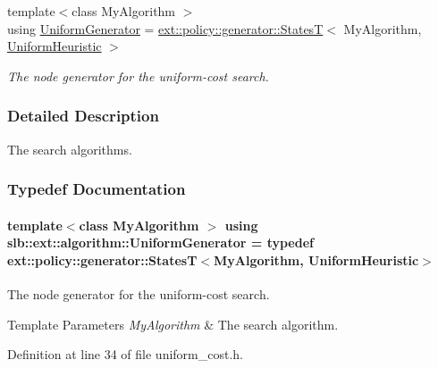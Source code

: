 \begin{DoxyCompactItemize}
{\footnotesize template$<$class My\+Algorithm $>$ }\\using \hyperlink{namespaceslb_1_1ext_1_1algorithm_afe2eae9c2d224b1677a1e95c013c13b4}{Uniform\+Generator} = \hyperlink{structslb_1_1ext_1_1policy_1_1generator_1_1StatesT}{ext\+::policy\+::generator\+::\+StatesT}$<$ My\+Algorithm, \hyperlink{namespaceslb_1_1ext_1_1algorithm_a4df6bd68a037486451c16445cb78d21f}{Uniform\+Heuristic} $>$
\begin{DoxyCompactList}\small\item\em The node generator for the uniform-\/cost search. \end{DoxyCompactList}\end{DoxyCompactItemize}


\subsubsection{Detailed Description}
The search algorithms. 

\subsubsection{Typedef Documentation}
\paragraph[{\texorpdfstring{Uniform\+Generator}{UniformGenerator}}]{\setlength{\rightskip}{0pt plus 5cm}template$<$class My\+Algorithm $>$ using {\bf slb\+::ext\+::algorithm\+::\+Uniform\+Generator} = typedef {\bf ext\+::policy\+::generator\+::\+StatesT}$<$My\+Algorithm, {\bf Uniform\+Heuristic}$>$}\hypertarget{namespaceslb_1_1ext_1_1algorithm_afe2eae9c2d224b1677a1e95c013c13b4}{}\label{namespaceslb_1_1ext_1_1algorithm_afe2eae9c2d224b1677a1e95c013c13b4}


The node generator for the uniform-\/cost search. 


\begin{DoxyTemplParams}{Template Parameters}
{\em My\+Algorithm} & The search algorithm. \\
\hline
\end{DoxyTemplParams}


Definition at line 34 of file uniform\+\_\+cost.\+h.

